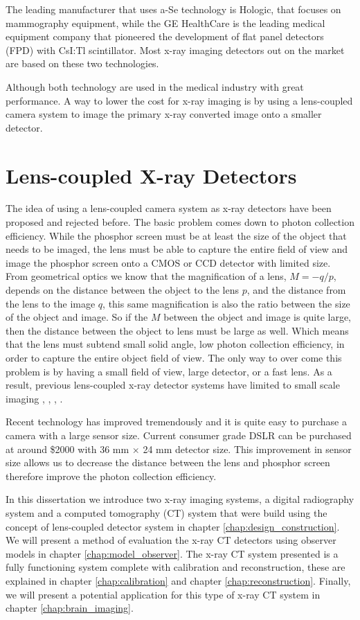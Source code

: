 The leading manufacturer that uses a-Se technology is Hologic, that focuses on mammography equipment, while the GE HealthCare is the leading medical equipment company that pioneered the development of flat panel detectors (FPD) with CsI:Tl scintillator.  Most x-ray imaging detectors out on the market are based on these two technologies.  

Although both technology are used in the medical industry with great performance.  A way to lower the cost for x-ray imaging is by using a lens-coupled camera system to image the primary x-ray converted image onto a smaller detector.

\section{Lens-coupled X-ray Detectors}
The idea of using a lens-coupled camera system as x-ray detectors have been proposed and rejected before.  The basic problem comes down to photon collection efficiency.  While the phosphor screen must be at least the size of the object that needs to be imaged, the lens must be able to capture the entire field of view and image the phosphor screen onto a CMOS or CCD detector with limited size.  From geometrical optics we know that the magnification of a lens, $M = -q/p$, depends on the distance between the object to the lens $p$, and the distance from the lens to the image $q$, this same magnification is also the ratio between the size of the object and image.  So if the $M$ between the object and image is quite large, then the distance between the object to lens must be large as well.  Which means that the lens must subtend small solid angle, low photon collection efficiency, in order to capture the entire object field of view.  The only way to over come this problem is by having a small field of view, large detector, or a fast lens.  As a result, previous lens-coupled x-ray detector systems have limited to small scale imaging \cite{kim2005}, \cite{lee2001}, \cite{tate2005}, \cite{madden2006}.  

Recent technology has improved tremendously and it is quite easy to purchase a camera with a large sensor size.  Current consumer grade DSLR can be purchased at around \$2000 with 36 mm $\times$ 24 mm detector size.  This improvement in sensor size allows us to decrease the distance between the lens and phosphor screen therefore improve the photon collection efficiency.

In this dissertation we introduce two x-ray imaging systems, a digital radiography system and a computed tomography (CT) system that were build using the concept of lens-coupled detector system in chapter \ref{chap:design_construction}.  We will present a method of evaluation the x-ray CT detectors using observer models in chapter \ref{chap:model_observer}.   The x-ray CT system presented is a fully functioning system complete with calibration and reconstruction, these are explained in chapter \ref{chap:calibration} and chapter \ref{chap:reconstruction}.  Finally, we will present a potential application for this type of x-ray CT system in chapter \ref{chap:brain_imaging}.  
